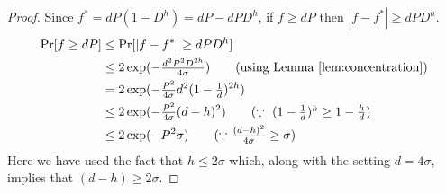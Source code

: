 \upperboundf*

\begin{proof}
    Since $f^*=dP(1-D^h)=dP - dPD^h$, if $f \ge dP$ then $|f-f^*| \ge dPD^h$. 
    \begin{align*}
	\Pr[f \ge dP] & \le \Pr[|f-f^*| \ge dPD^h]\\
		      & \le 2 \exp(-\tfrac{d^2 P^2 D^{2h}}{4\sigma}) \tag{using Lemma~\ref{lem:concentration}}\\
		      & = 2 \exp(-\tfrac{P^2}{4\sigma} d^2(1-\tfrac{1}{d})^{2h})\\
		      & \le 2 \exp(-\tfrac{P^2}{4\sigma} (d-h)^2) \tag{$\because~(1-\tfrac{1}{d})^h \ge 1-\tfrac{h}{d}$}\\
		      & \le 2 \exp(-P^2\sigma) \tag{$\because$ $\tfrac{(d-h)^2}{4\sigma} \ge \sigma$}
    \end{align*}
    Here we have used the fact that $h \le 2\sigma$ which, along with the setting $d=4\sigma$, implies that $(d-h) \ge 2\sigma$.
\end{proof}

\hconcentrationlemma*

